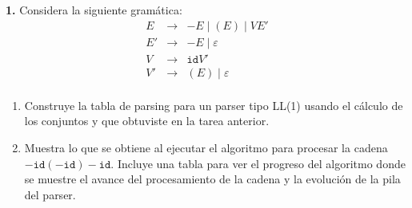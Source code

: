 \textbf{1.} Considera la siguiente gram\'atica:
\[
\begin{array}{rcl}
E & \to & -E \mid (E) \mid VE'\\
E' & \to & -E \mid \varepsilon\\
V & \to & \mathtt{id}V'\\
V' & \to & (E) \mid \varepsilon\\
\end{array}
\]

\begin{enumerate}
\item Construye la tabla de parsing para un parser tipo 
LL(1) usando el c\'alculo de los conjuntos {\ffst} y {\ffollow} que obtuviste 
en la tarea anterior. 
\item Muestra 
lo que se obtiene al ejecutar el algoritmo para procesar la cadena 
$-\mathtt{id}(-\mathtt{id})-\mathtt{id}$.
Incluye una tabla para ver el progreso del algoritmo donde se muestre el avance 
del procesamiento de la cadena y la evoluci\'on de la pila del parser. 
\end{enumerate}
